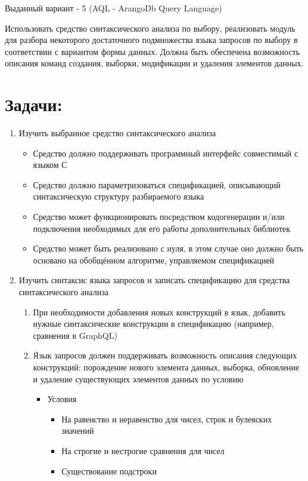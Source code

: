 \documentclass[12pt,onecolumn]{article}
\begin{document}
Выданный вариант - 5 (AQL - ArangoDb Query Language)


Использовать средство синтаксического анализа по выбору, реализовать модуль для разбора некоторого
достаточного подмножества языка запросов по выбору в соответствии с вариантом формы данных. Должна
быть обеспечена возможность описания команд создания, выборки, модификации и удаления элементов
данных.
\section{Задачи:}
\begin{enumerate}
  \item {Изучить выбранное средство синтаксического анализа
   \begin{itemize}
    \item Средство должно поддерживать программный интерфейс совместимый с языком С
    \item Средство должно параметризоваться спецификацией, описывающий синтаксическую структуру
    разбираемого языка
    \item Средство может функционировать посредством кодогенерации и/или подключения
    необходимых для его работы дополнительных библиотек
    \item Средство может быть реализовано с нуля, в этом случае оно должно быть основано на
    обобщённом алгоритме, управляемом спецификацией
   \end{itemize}
  }
  \item {Изучить синтаксис языка запросов и записать спецификацию для средства синтаксического анализа
    \begin{enumerate}
      \item При необходимости добавления новых конструкций в язык, добавить нужные синтаксические
      конструкции в спецификацию (например, сравнения в GraphQL)
      \item {Язык запросов должен поддерживать возможность описания следующих конструкций:
      порождение нового элемента данных, выборка, обновление и удаление существующих
      элементов данных по условию
      \begin{itemize}
        \item {
          Условия
          \begin{itemize}
            \item На равенство и неравенство для чисел, строк и булевских значений
            \item На строгие и нестрогие сравнения для чисел
            \item Существование подстроки

\end{itemize}}
\end{itemize}}
\end{enumerate}}
\end{enumerate}
\end{document}
